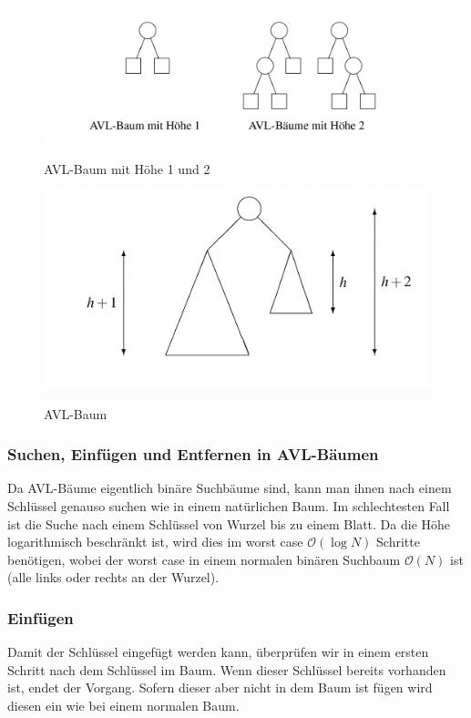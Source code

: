 \documentclass[a4paper]{article}
\begin{document}
\begin{figure}[h] 
\caption{AVL-Baum mit Höhe 1 und 2}
\centering
\includegraphics[scale= 0.5]{Pictures/AVL-trees-height.png}
\label{fig: AVL-trees-height}
\end{figure}

\begin{figure}[t] 
\caption{AVL-Baum }
\centering
\includegraphics[scale= 0.5]{Pictures/AVL-trees-allg.png}
\label{fig: AVL-trees-allg}
\end{figure}

\newpage
\subsubsection{Suchen, Einfügen und Entfernen in AVL-Bäumen}
Da AVL-Bäume eigentlich binäre Suchbäume sind, kann man ihnen nach einem Schlüssel genauso suchen wie in einem natürlichen Baum. Im schlechtesten Fall ist die Suche nach einem Schlüssel von Wurzel bis zu einem Blatt. Da die Höhe logarithmisch beschränkt ist, wird dies im worst case $\mathcal{O} (\log N)$ Schritte benötigen, wobei der worst case in einem normalen binären Suchbaum $\mathcal{O} (N)$ ist (alle links oder rechts an der Wurzel). 

\subsubsection{Einfügen}\label{subsection EinfügenAVL}
Damit der Schlüssel eingefügt werden kann, überprüfen wir in einem ersten Schritt nach dem Schlüssel im Baum. Wenn dieser Schlüssel bereits vorhanden ist, endet der Vorgang. Sofern dieser aber nicht in dem Baum ist fügen wird diesen ein wie bei einem normalen Baum.
\end{document}

